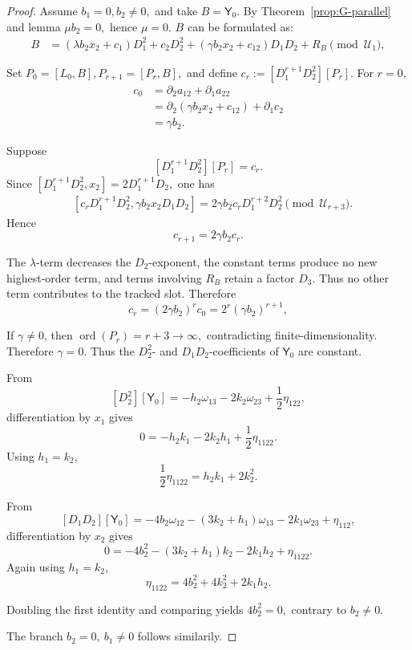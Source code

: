 \documentclass[11pt,a4paper]{article}
\numberwithin{equation}{section}
\theoremstyle{journalplain}
\theoremstyle{journaldef}
\begin{document}
\begin{tcolorbox}[
  title={Exclusion of the one-axis branches},
  breakable
]
\begin{proof}
Assume
\(
b_1=0,b_2\ne0,
\)
and take \(B=\mathsf Y_0\). By Theorem~\ref{prop:G-parallel} and lemma
\(
\mu b_2=0,
\)
hence \(\mu=0.\) $B$ can be formulated as:
\begin{align}
B
&=
(\lambda b_2x_2+c_1)D_1^2
+c_2D_2^2 + 
(\gamma b_2x_2+c_{12})D_1D_2
+R_B
\pmod{\mathcal U_1},
\end{align}

Set
\(
P_0=[L_0,B],
P_{r+1}=[P_r,B],
\)
and define
\(
c_r:=[D_1^{r+1}D_2^2][P_r].
\)
For \(r=0\),
\[
\begin{aligned}
c_0
&=
\partial_2a_{12}+\partial_1a_{22}\\
&=
\partial_2(\gamma b_2x_2+c_{12})
+\partial_1c_2\\
&=
\gamma b_2.
\end{aligned}
\]

Suppose
\[
[D_1^{r+1}D_2^2][P_r]=c_r.
\]
Since
\(
[D_1^{r+1}D_2^2,x_2]
=
2D_1^{r+1}D_2,
\)
one has
\[
\begin{aligned}
&[c_rD_1^{r+1}D_2^2,
  \gamma b_2x_2D_1D_2]=
2\gamma b_2c_rD_1^{r+2}D_2^2
\pmod{\mathcal U_{r+3}}.
\end{aligned}
\]
Hence
\[
c_{r+1}=2\gamma b_2c_r.
\]

The \(\lambda\)-term decreases the \(D_2\)-exponent, the constant terms
produce no new highest-order term, and terms involving \(R_B\) retain a
factor \(D_3\). Thus no other term contributes to the tracked slot.
Therefore
\[
c_r
=
(2\gamma b_2)^rc_0
=
2^r(\gamma b_2)^{r+1},
\]

If \(\gamma\ne0\), then
\(
\operatorname{ord}(P_r)=r+3\to\infty,
\)
contradicting finite-dimensionality. Therefore
\(
\gamma=0.
\)
Thus the \(D_2^2\)- and \(D_1D_2\)-coefficients of \(\mathsf Y_0\) are
constant.

From
\[
[D_2^2][\mathsf Y_0]
=
-h_2\omega_{13}-2k_2\omega_{23}
+\frac12\eta_{122},
\]
differentiation by \(x_1\) gives
\[
0=-h_2k_1-2k_2h_1+\frac12\eta_{1122}.
\]
Using \(h_1=k_2\),
\[
\frac12\eta_{1122}=h_2k_1+2k_2^2.
\]

From
\[
[D_1D_2][\mathsf Y_0]
=
-4b_2\omega_{12}
-(3k_2+h_1)\omega_{13}
-2k_1\omega_{23}
+\eta_{112},
\]
differentiation by \(x_2\) gives
\[
0=-4b_2^2-(3k_2+h_1)k_2-2k_1h_2+\eta_{1122}.
\]
Again using \(h_1=k_2\),
\[
\eta_{1122}
=
4b_2^2+4k_2^2+2k_1h_2.
\]

Doubling the first identity and comparing yields
\(
4b_2^2=0,
\)
contrary to \(b_2\ne0\).

The branch \(b_2=0,\ b_1\ne0\) follows similarily.
\end{proof}
\end{tcolorbox}
\end{document}
